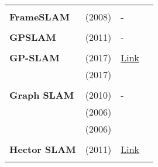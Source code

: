 \documentclass[a4paper,12pt]{scrartcl}
\begin{document}
{\begin{longtable}{l|l|l|l}
                           &                                   &                                                                    &                       \\
    \textbf{FrameSLAM}     & \cite{Konolige2008} (2008)        & -                                                                  &                       \\
                           &                                   &                                                                    &                       \\
    \textbf{GPSLAM}        & \cite{Pirker2011a} (2011)         & -                                                                  &                       \\
                           &                                   &                                                                    &                       \\
    \textbf{GP-SLAM}       & \cite{Yan2017} (2017)             & {\href{https://github.com/gtrll/gpslam}{Link}}                     &                       \\
                           & \cite{Dong2017} (2017)            &                                                                    &                       \\
                           &                                   &                                                                    &                       \\
    \textbf{Graph SLAM}    & \cite{Grisetti2010} (2010)        & -                                                                  &                       \\
                           & \cite{Olson2006} (2006)           &                                                                    &                       \\
                           & \cite{Thrun2006} (2006)           &                                                                    &                       \\
                           &                                   &                                                                    &                       \\
    \textbf{Hector SLAM}   & \cite{Kohlbrecher2011} (2011)     & {\href{https://github.com/tu-darmstadt-ros-pkg/hector_slam}{Link}} &                       \\
                           &                                   &                                                                    &                       \\

\end{longtable}}
\end{document}
